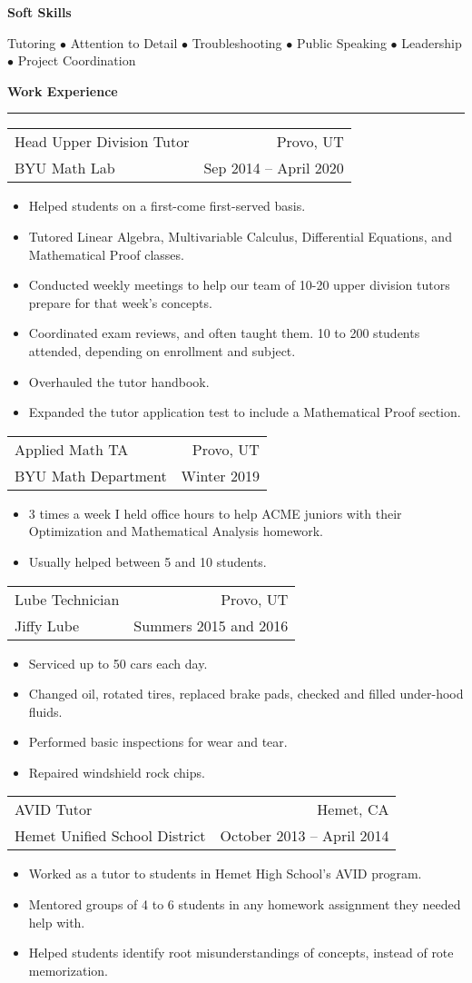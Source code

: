 \documentclass{article}
\newenvironment{compactItemize}{
  \begin{itemize}[itemsep=0ex, parsep=0ex, partopsep=0ex, topsep= -7pt]
}{
  \end{itemize}
}
\newcommand{\jobInfo}[4]{
  \begingroup
  \setlength{\tabcolsep}{0ex}
  \begin{tabularx}{\linewidth}{X r}
    #1 & %
    #2\\ %
    #3 & %
    #4   %
  \end{tabularx}%
  \endgroup%
}
\begin{document}
\textbf{Soft Skills}
  \begin{center}
  Tutoring $\bullet$ Attention to Detail $\bullet$ Troubleshooting $\bullet$ Public Speaking $\bullet$ Leadership $\bullet$ Project Coordination
  \end{center}

\textbf{Work Experience}
\smallskip
\hrule

\jobInfo{Head Upper Division Tutor}{Provo, UT}{BYU Math Lab}{Sep 2014 -- April 2020}
\begin{compactItemize}
  \item Helped students on a first-come first-served basis.
  \item Tutored Linear Algebra, Multivariable Calculus, Differential Equations, and Mathematical Proof classes.
  \item Conducted weekly meetings to help our team of 10-20 upper division tutors prepare for that week's concepts.
  \item Coordinated exam reviews, and often taught them.  10 to 200 students attended, depending on enrollment and subject.
  \item Overhauled the tutor handbook.
  \item Expanded the tutor application test to include a Mathematical Proof section.
\end{compactItemize}
\medskip

\jobInfo{Applied Math TA}{Provo, UT}{BYU Math Department}{Winter 2019}
\begin{compactItemize}
  \item 3 times a week I held office hours to help ACME juniors with their Optimization and Mathematical Analysis homework.
  \item Usually helped between 5 and 10 students.
\end{compactItemize}
\medskip

\jobInfo{Lube Technician}{Provo, UT}{Jiffy Lube}{Summers 2015 and 2016}
\begin{compactItemize}
  \item Serviced up to 50 cars each day.
  \item Changed oil, rotated tires, replaced brake pads, checked and filled under-hood fluids.
  \item Performed basic inspections for wear and tear.
  \item Repaired windshield rock chips.
\end{compactItemize}
\medskip

\jobInfo{AVID Tutor}{Hemet, CA}{Hemet Unified School District}{October 2013 -- April 2014}
\begin{compactItemize}
  \item Worked as a tutor to students in Hemet High School's AVID program.
  \item Mentored groups of 4 to 6 students in any homework assignment they needed help with.
  \item Helped students identify root misunderstandings of concepts, instead of rote memorization.
\end{compactItemize}
\medskip
\end{document}
